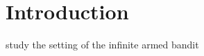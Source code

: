 \begin{abstract}

\end{abstract}

\section{Introduction}


 study the setting of the infinite armed bandit
